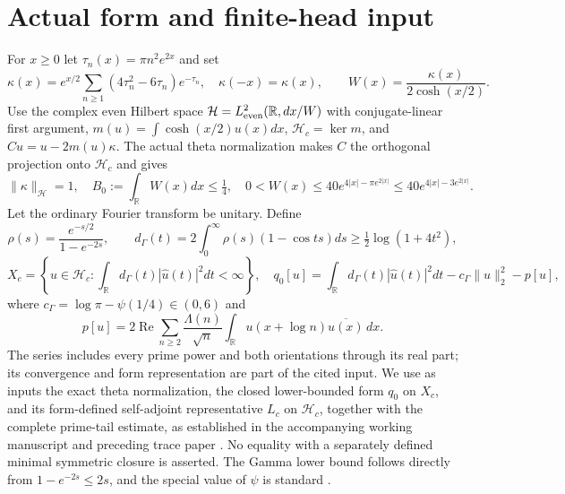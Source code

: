 \documentclass[11pt]{article}
\newcommand{\R}{\mathbb R}\newcommand{\Hh}{\mathcal H}\newcommand{\Nn}{\mathcal N}\newcommand{\norm}[1]{\lVert#1\rVert}\newcommand{\ip}[2]{\langle #1,#2\rangle}\newcommand{\dom}{\operatorname{Dom}}
\begin{document}
\section{Actual form and finite-head input}\label{setting}
For $x\ge0$ let $\tau_n(x)=\pi n^2e^{2x}$ and set
\[\kappa(x)=e^{x/2}\sum_{n\ge1}(4\tau_n^2-6\tau_n)e^{-\tau_n},\quad\kappa(-x)=\kappa(x),\qquad W(x)=\frac{\kappa(x)}{2\cosh(x/2)}.\]
Use the complex even Hilbert space $\Hh=L^2_{\rm even}(\R,dx/W)$ with conjugate-linear first argument, $m(u)=\int\cosh(x/2)u(x)dx$, $\Hh_c=\ker m$, and $Cu=u-2m(u)\kappa$. The actual theta normalization makes $C$ the orthogonal projection onto $\Hh_c$ and gives
\begin{equation}\label{Wbound}
 \norm\kappa_{\Hh}=1,\quad B_0:=\int_\R W(x)dx\le\tfrac14,\quad
 0<W(x)\le40e^{4|x|-\pi e^{2|x|}}\le40e^{4|x|-3e^{2|x|}}.
\end{equation}
Let the ordinary Fourier transform be unitary. Define
\[\rho(s)=\frac{e^{-s/2}}{1-e^{-2s}},\qquad d_\Gamma(t)=2\int_0^\infty\rho(s)(1-\cos ts)ds\ge\tfrac12\log(1+4t^2),\]
\[X_c=\left\{u\in\Hh_c:\int_\R d_\Gamma(t)|\widehat u(t)|^2dt<\infty\right\},\quad
 q_0[u]=\int_\R d_\Gamma(t)|\widehat u(t)|^2dt-c_\Gamma\norm u_2^2-p[u],
\]
where $c_\Gamma=\log\pi-\psi(1/4)\in(0,6)$ and
\[p[u]=2\operatorname{Re}\sum_{n\ge2}\frac{\Lambda(n)}{\sqrt n}\int_\R u(x+\log n)\overline{u(x)}\,dx.\]
The series includes every prime power and both orientations through its real part; its convergence and form representation are part of the cited input. We use as inputs the exact theta normalization, the closed lower-bounded form $q_0$ on $X_c$, and its form-defined self-adjoint representative $L_c$ on $\Hh_c$, together with the complete prime-tail estimate, as established in the accompanying working manuscript and preceding trace paper \cite{unified,previous}. No equality with a separately defined minimal symmetric closure is asserted. The Gamma lower bound follows directly from $1-e^{-2s}\le2s$, and the special value of $\psi$ is standard \cite{dlmf}.
\end{document}
